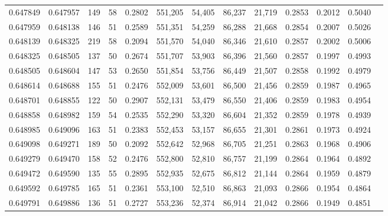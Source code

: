 \begin{tabular}{rrrrrrrrrrrrr}
0.647849 & 0.647957 &   149 &  58 &                                     0.2802 & 551,205 &  54,405 &  86,237 &  21,719 & 0.2853 & 0.2012 & 0.5040 \\
0.647959 & 0.648138 &   146 &  51 &                                     0.2589 & 551,351 &  54,259 &  86,288 &  21,668 & 0.2854 & 0.2007 & 0.5026 \\
0.648139 & 0.648325 &   219 &  58 &                                     0.2094 & 551,570 &  54,040 &  86,346 &  21,610 & 0.2857 & 0.2002 & 0.5006 \\
0.648325 & 0.648505 &   137 &  50 &                                     0.2674 & 551,707 &  53,903 &  86,396 &  21,560 & 0.2857 & 0.1997 & 0.4993 \\
0.648505 & 0.648604 &   147 &  53 &                                     0.2650 & 551,854 &  53,756 &  86,449 &  21,507 & 0.2858 & 0.1992 & 0.4979 \\
0.648614 & 0.648688 &   155 &  51 &                                     0.2476 & 552,009 &  53,601 &  86,500 &  21,456 & 0.2859 & 0.1987 & 0.4965 \\
0.648701 & 0.648855 &   122 &  50 &                                     0.2907 & 552,131 &  53,479 &  86,550 &  21,406 & 0.2859 & 0.1983 & 0.4954 \\
0.648858 & 0.648982 &   159 &  54 &                                     0.2535 & 552,290 &  53,320 &  86,604 &  21,352 & 0.2859 & 0.1978 & 0.4939 \\
0.648985 & 0.649096 &   163 &  51 &                                     0.2383 & 552,453 &  53,157 &  86,655 &  21,301 & 0.2861 & 0.1973 & 0.4924 \\
0.649098 & 0.649271 &   189 &  50 &                                     0.2092 & 552,642 &  52,968 &  86,705 &  21,251 & 0.2863 & 0.1968 & 0.4906 \\
0.649279 & 0.649470 &   158 &  52 &                                     0.2476 & 552,800 &  52,810 &  86,757 &  21,199 & 0.2864 & 0.1964 & 0.4892 \\
0.649472 & 0.649590 &   135 &  55 &                                     0.2895 & 552,935 &  52,675 &  86,812 &  21,144 & 0.2864 & 0.1959 & 0.4879 \\
0.649592 & 0.649785 &   165 &  51 &                                     0.2361 & 553,100 &  52,510 &  86,863 &  21,093 & 0.2866 & 0.1954 & 0.4864 \\
0.649791 & 0.649886 &   136 &  51 &                                     0.2727 & 553,236 &  52,374 &  86,914 &  21,042 & 0.2866 & 0.1949 & 0.4851 \\

\end{tabular}
